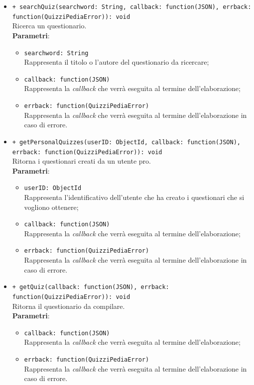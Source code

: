 \begin{itemize}
\begin{itemize}
			\item \texttt{+ searchQuiz(searchword: String, callback: function(JSON), errback: function(QuizziPediaError)): void}\\
			Ricerca un questionario.\\
			\textbf{Parametri}:
			\begin{itemize}
				\item \texttt{searchword: String}\\
				Rappresenta il titolo o l'autore del questionario da ricercare;
				\item \texttt{callback: function(JSON)}\\
				Rappresenta la \textit{callback} che verrà eseguita al termine dell'elaborazione;
				\item \texttt{errback: function(QuizziPediaError)}\\
				Rappresenta la \textit{callback} che verrà eseguita al termine dell'elaborazione in caso di errore.
			\end{itemize}
			
			\item \texttt{+ getPersonalQuizzes(userID: ObjectId, callback: function(JSON), errback: function(QuizziPediaError)): void}\\
			Ritorna i questionari creati da un utente pro.\\
			\textbf{Parametri}:
			\begin{itemize}
				\item \texttt{userID: ObjectId}\\
				Rappresenta l'identificativo dell'utente che ha creato i questionari che si vogliono ottenere;
				\item \texttt{callback: function(JSON)}\\
				Rappresenta la \textit{callback} che verrà eseguita al termine dell'elaborazione;
				\item \texttt{errback: function(QuizziPediaError)}\\
				Rappresenta la \textit{callback} che verrà eseguita al termine dell'elaborazione in caso di errore.
			\end{itemize}
			
			\item \texttt{+ getQuiz(callback: function(JSON), errback: function(QuizziPediaError)): void}\\
			Ritorna il questionario da compilare.\\
			\textbf{Parametri}:
			\begin{itemize}
				\item \texttt{callback: function(JSON)}\\
				Rappresenta la \textit{callback} che verrà eseguita al termine dell'elaborazione;
				\item \texttt{errback: function(QuizziPediaError)}\\
				Rappresenta la \textit{callback} che verrà eseguita al termine dell'elaborazione in caso di errore.
			\end{itemize}
		\end{itemize}
\end{itemize}